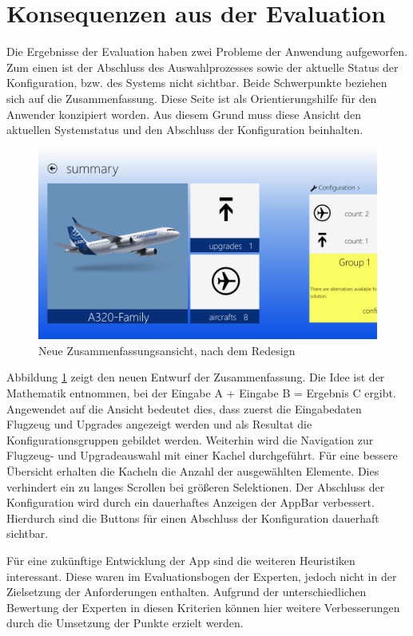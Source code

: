 \section{Konsequenzen aus der Evaluation}
Die Ergebnisse der Evaluation haben zwei Probleme der Anwendung aufgeworfen. Zum einen ist der Abschluss des Auswahlprozesses sowie der aktuelle Status der Konfiguration, bzw. des Systems nicht sichtbar. Beide Schwerpunkte beziehen sich auf die Zusammenfassung. Diese Seite ist als Orientierungshilfe für den Anwender konzipiert worden. Aus diesem Grund muss diese Ansicht den aktuellen Systemstatus und den Abschluss der Konfiguration beinhalten.  
\begin{figure}[H]
\includegraphics[width=\hsize]{images/impl/summary_impl}
\caption{Neue Zusammenfassungsansicht, nach dem Redesign}
\label{redesignSummary}
\end{figure}
Abbildung \ref{redesignSummary} zeigt den neuen Entwurf der Zusammenfassung. Die Idee ist der Mathematik entnommen, bei der Eingabe A + Eingabe B = Ergebnis C ergibt. Angewendet auf die Ansicht bedeutet dies, dass zuerst die Eingabedaten Flugzeug und Upgrades angezeigt werden und als Resultat die Konfigurationsgruppen gebildet werden. Weiterhin wird die Navigation zur Flugzeug- und Upgradeauswahl mit einer Kachel durchgeführt. Für eine bessere Übersicht erhalten die Kacheln die Anzahl der ausgewählten Elemente. Dies verhindert ein zu langes Scrollen bei größeren Selektionen. 
Der Abschluss der Konfiguration wird durch ein dauerhaftes Anzeigen der AppBar verbessert. Hierdurch sind die Buttons für einen Abschluss der Konfiguration dauerhaft sichtbar.\par 

Für eine zukünftige Entwicklung der App sind die weiteren Heuristiken interessant. Diese waren im Evaluationsbogen der Experten, jedoch nicht in der Zielsetzung der Anforderungen enthalten. Aufgrund der unterschiedlichen Bewertung der Experten in diesen Kriterien können hier weitere Verbesserungen durch die Umsetzung der Punkte erzielt werden. \par 